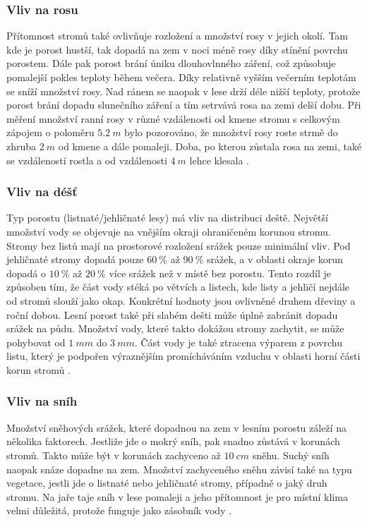 \subsubsection{Vliv na rosu}
Přítomnost stromů také ovlivňuje rozložení a množství rosy v jejich okolí. Tam kde je porost hustší, tak dopadá na zem v noci méně rosy díky stínění povrchu porostem. Dále pak porost brání úniku dlouhovlnného záření, což způsobuje pomalejší pokles teploty během večera. Díky relativně vyšším večerním teplotám se sníží množství rosy. Nad ránem se naopak v lese drží déle nižší teploty, protože porost brání dopadu slunečního záření a tím setrvává rosa na zemi delší dobu. Při měření množství ranní rosy v různé vzdálenosti od kmene stromu s celkovým zápojem o poloměru $\SI{5.2}{m}$ bylo pozorováno, že množství rosy roste strmě do zhruba $\SI{2}{m}$ od kmene a dále pomaleji. Doba, po kterou zůstala rosa na zemi, také se vzdáleností rostla a od vzdálenosti $\SI{4}{m}$ lehce klesala \parencite{alma}.

\subsubsection{Vliv na déšť}
Typ porostu (listnaté/jehličnaté lesy) má vliv na distribuci deště. Největší množství vody se objevuje na vnějším okraji ohraničeném korunou stromu. Stromy bez listů mají na prostorové rozložení srážek pouze minimální vliv. Pod jehličnaté stromy dopadá pouze $\SI{60}{\%}$ až $\SI{90}{\%}$ srážek, a v oblasti okraje korun dopadá o $\SI{10}{\%}$ až $\SI{20}{\%}$ více srážek než v místě bez porostu. Tento rozdíl je způsoben tím, že část vody stéká po větvích a listech, kde listy a jehličí nejdále od stromů slouží jako okap. Konkrétní hodnoty jsou ovlivněné druhem dřeviny a roční dobou. Lesní porost také při slabém dešti může úplně zabránit dopadu srážek na půdu. Množství vody, které takto dokážou stromy zachytit, se může pohybovat od $\SI{1}{mm}$ do $\SI{3}{mm}$. Část vody je také ztracena výparem z povrchu listu, který je podpořen výraznějším promícháváním vzduchu v oblasti horní části korun stromů \parencite{alma}.

\subsubsection{Vliv na sníh}\label{chap:vlivnasnih}
Množství sněhových srážek, které dopadnou na zem v lesním porostu záleží na několika faktorech. Jestliže jde o mokrý sníh, pak snadno zůstává v korunách stromů. Takto může být v korunách zachyceno až $\SI{10}{cm}$ sněhu. Suchý sníh naopak snáze dopadne na zem. Množství zachyceného sněhu závisí také na typu vegetace, jestli jde o listnaté nebo jehličnaté stromy, případně o jaký druh stromu. Na jaře taje sníh v lese pomaleji a jeho přítomnost je pro místní klima velmi důležitá, protože funguje jako zásobník vody \parencite{alma}.

